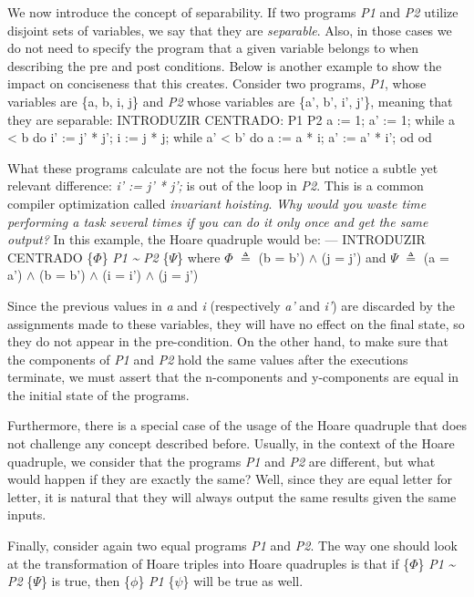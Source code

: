 {We now introduce the concept of separability.
If two programs \emph{P1} and \emph{P2} utilize disjoint sets of variables, we say that they are \emph{separable}.
Also, in those cases we do not need to specify the program that a given variable belongs to when describing the pre and post conditions.
Below is another example to show the impact on conciseness that this creates.
Consider two programs, \emph{P1}, whose variables are \{{a, b, i, j}\} and \emph{P2} whose variables are \{{a', b', i', j'}\}, meaning that they are separable:
INTRODUZIR CENTRADO:
P1  P2
a := 1; a' := 1;
while a < b do  i' := j' * j'; 
i := j * j; while a' < b' do
a := a * i; a' := a' * i'; 
od  od

What these programs calculate are not the focus here but notice a subtle yet relevant difference: \emph{i' := j' * j';} is out of the loop in \emph{P2}.
This is a common compiler optimization called \emph{invariant hoisting}.
\emph{Why would you waste time performing a task several times if you can do it only once and get the same output?}
In this example, the Hoare quadruple would be:
--- INTRODUZIR CENTRADO \{$\Phi$\} \emph{P1} \emph{\textasciitilde} \emph{P2} \{$\Psi$\} where $\Phi$ $\triangleq$ (b = b') $\land$ (j = j')
                                                                                           and $\Psi$ $\triangleq$ (a = a') $\land$ (b = b') $\land$ (i = i') $\land$ (j = j')

Since the previous values in \emph{a} and \emph{i} (respectively \emph{a'} and \emph{i'}) are discarded by the assignments made to these variables, they will have no effect on the final state, so they do not appear in the pre-condition.
On the other hand, to make sure that the components of \emph{P1} and \emph{P2} hold the same values after the executions terminate, we must assert that the n-components and y-components are equal in the initial state of the programs. 

Furthermore, there is a special case of the usage of the Hoare quadruple that does not challenge any concept described before.
Usually, in the context of the Hoare quadruple, we consider that the programs \emph{P1} and \emph{P2} are different, but what would happen if they are exactly the same?
Well, since they are equal letter for letter, it is natural that they will always output the same results given the same inputs.

Finally, consider again two equal programs \emph{P1} and \emph{P2}.
The way one should look at the transformation of Hoare triples into Hoare quadruples is that if \{$\Phi$\} \emph{P1} \emph{\textasciitilde} \emph{P2} \{$\Psi$\} is true, then \{$\phi$\} \emph{P1} \{$\psi$\} will be true as well.


}
